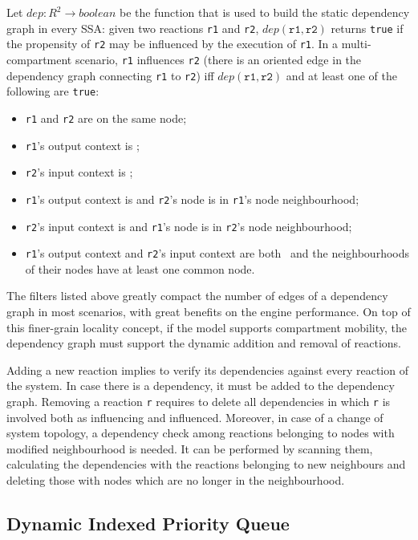 \documentclass[12pt,a4paper,twoside,openright]{book}
\begin{document}
Let $dep: R^2 \longrightarrow boolean$ be the function that is used to build the static dependency graph in every SSA: given two reactions \texttt{r1} and \texttt{r2}, $dep(\texttt{r1}, \texttt{r2})$ returns \texttt{true} if the propensity of \texttt{r2} may be influenced by the execution of \texttt{r1}.
%
In a multi-compartment scenario, \texttt{r1} influences \texttt{r2} (there is an oriented edge in the dependency graph connecting \texttt{r1} to \texttt{r2}) iff $dep(\texttt{r1},\texttt{r2})$ and at least one of the following are \texttt{true}:
\begin{itemize}
 \item \texttt{r1} and \texttt{r2} are on the same node;
 \item \texttt{r1}'s output context is \globalc{};
 \item \texttt{r2}'s input context is \globalc{};
 \item \texttt{r1}'s output context is \neighborhood{} and \texttt{r2}'s node is in \texttt{r1}'s node neighbourhood;
 \item \texttt{r2}'s input context is \neighborhood{} and \texttt{r1}'s node is in \texttt{r2}'s node neighbourhood;
 \item \texttt{r1}'s output context and \texttt{r2}'s input context are both \neighborhood\ and the neighbourhoods of their nodes have at least one common node. 
\end{itemize}
%
The filters listed above greatly compact the number of edges of a dependency graph in most scenarios, with great benefits on the engine performance.
%
On top of this finer-grain locality concept, if the model supports compartment mobility, the dependency graph must support the dynamic addition and removal of reactions.

Adding a new reaction implies to verify its dependencies against every reaction of the system. In case there is a dependency, it must be added to the dependency graph. 
Removing a reaction \texttt{r} requires to delete all dependencies in which \texttt{r} is involved both as influencing and influenced.
Moreover, in case of a change of system topology, a dependency check among reactions belonging to nodes with modified neighbourhood is needed. It can be performed by scanning them, calculating the dependencies with the reactions belonging to new neighbours and deleting those with nodes which are no longer in the neighbourhood.

\subsection{Dynamic Indexed Priority Queue}
\end{document}
